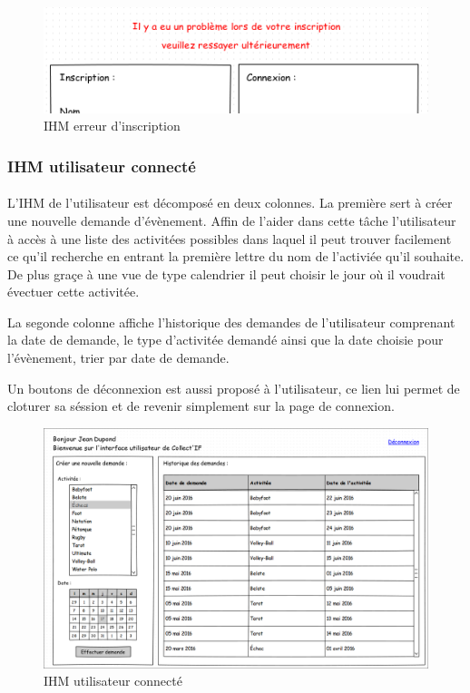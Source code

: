 \documentclass[a4paper,11pt]{article}
\begin{document}
\begin{figure}[H]
  \begin{center}
    \includegraphics[width=15cm]{../../IHM/IHM_connection_utilisateur_erreur_ins_z.png}
    \caption{IHM erreur d'inscription}
  \end{center}
\end{figure}

\pagebreak
\subsubsection{IHM utilisateur connecté}

\paragraph{}
L'IHM de l'utilisateur est décomposé en deux colonnes. La première sert à créer une nouvelle demande d'évènement. Affin de l'aider dans cette tâche l'utilisateur à accès à une liste des activitées possibles dans laquel il peut trouver facilement ce qu'il recherche en entrant la première lettre du nom de l'activiée qu'il souhaite. De plus graçe à une vue de type calendrier il peut choisir le jour où il voudrait évectuer cette activitée.

La segonde colonne affiche l'historique des demandes de l'utilisateur comprenant la date de demande, le type d'activitée demandé ainsi que la date choisie pour l'évènement, trier par date de demande.

Un boutons de déconnexion est aussi proposé à l'utilisateur, ce lien lui permet de cloturer sa séssion et de revenir simplement sur la page de connexion.

\begin{figure}[H]
  \begin{center}
    \includegraphics[width=15cm]{../../IHM/IHM_utilisateur.png}
    \caption{IHM utilisateur connecté}
  \end{center}
\end{figure}
\end{document}
